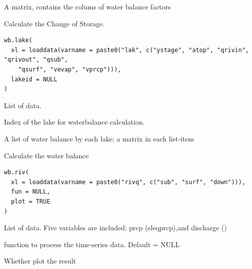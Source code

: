 \documentclass[a4paper]{book}
\begin{document}
%
\begin{Value}
A matrix, contains the colums of water balance factors
\end{Value}
%
\begin{Description}\relax
Calculate the Change of Storage.
\end{Description}
%
\begin{Usage}
\begin{verbatim}
wb.lake(
  xl = loaddata(varname = paste0("lak", c("ystage", "atop", "qrivin", "qrivout", "qsub",
    "qsurf", "vevap", "vprcp"))),
  lakeid = NULL
)
\end{verbatim}
\end{Usage}
%
\begin{Arguments}
\begin{ldescription}
\item[\code{xl}] List of data.

\item[\code{lakeid}] Index of the lake for waterbalance calculation.
\end{ldescription}
\end{Arguments}
%
\begin{Value}
A list of water balance by each lake; a matrix in each list-item
\end{Value}
%
\begin{Description}\relax
Calculate the water balance
\end{Description}
%
\begin{Usage}
\begin{verbatim}
wb.riv(
  xl = loaddata(varname = paste0("rivq", c("sub", "surf", "down"))),
  fun = NULL,
  plot = TRUE
)
\end{verbatim}
\end{Usage}
%
\begin{Arguments}
\begin{ldescription}
\item[\code{xl}] List of data. Five variables are included: prcp (eleqprcp),and discharge ()

\item[\code{fun}] function to process the time-series data. Default = NULL

\item[\code{plot}] Whether plot the result
\end{ldescription}
\end{Arguments}
\end{document}
